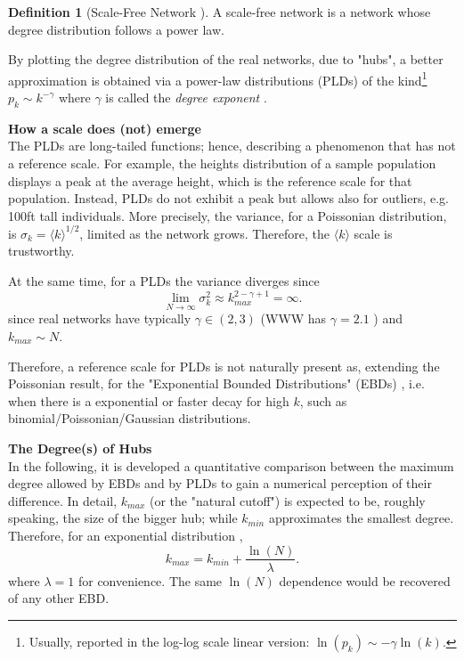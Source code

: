 \documentclass[a4paper,10pt,twoside]{book} %
\theoremstyle{definition}
\newtheorem{definition}{Definition}[section]
\begin{document}
\begin{definition}[Scale-Free Network \cite{Barabasi:1999_ScalRndNet}]
	A scale-free network is a network whose degree distribution follows a power law.
\end{definition}

By plotting the degree distribution of the real networks, due to "hubs", a better approximation is obtained via a power-law distributions (PLDs) of the kind\footnote{Usually, reported in the log-log scale linear version: $\ln(p_k) \sim -\gamma \ln(k)$.} $p_k \sim k^{-\gamma}$  where $\gamma$ is called the \textit{degree exponent} . 

{\large \textbf{How a scale does (not) emerge}} \\
The PLDs are long-tailed functions; hence, describing a phenomenon that has not a reference scale.
For example, the heights distribution of a sample population displays a peak at the average height, which is the reference scale for that population. Instead, PLDs do not exhibit a peak but allows also for outliers, e.g. 100ft tall individuals.
More precisely, the variance, for a Poissonian distribution, is $\sigma_k = \langle k \rangle ^ {1/2}$, limited as the network grows. Therefore, the $\langle k \rangle$ scale is trustworthy. 

At the same time, for a PLDs the variance diverges since \cite{barabasi::2016networkbook}	
\begin{equation}
	\lim_{N \to \infty} \sigma_k^2 \approx k_{max}^{2-\gamma+1} = \infty.
	\label{eq:sigma_SFnets}
\end{equation}
since real networks have typically $\gamma \in (2,3)$ (WWW has $\gamma =  2.1$ \cite{barabasi::2016networkbook}) and $k_{max} \sim N$. 

Therefore, a reference scale for PLDs is not naturally present as, extending the Poissonian result, for the "Exponential Bounded Distributions" (EBDs) \cite{barabasi::2016networkbook}, i.e. when there is a exponential or faster decay for high $k$, such as binomial/Poissonian/Gaussian distributions.

{\large \textbf{The Degree(s) of Hubs}} \\
In the following, it is developed a quantitative comparison between the maximum degree allowed by EBDs and by PLDs to gain a numerical perception of their difference.
In detail, $k_{max}$ (or the "natural cutoff") is expected to be, roughly speaking, the size of the bigger hub; while $k_{min}$ approximates the smallest degree.
Therefore, for an exponential distribution \cite{barabasi::2016networkbook}, 
\begin{equation}
	k_{max} = k_{min} + \frac{\ln(N)}{\lambda}.
	\label{eq:Expkmax_up}	
\end{equation}
where $\lambda = 1$ for convenience. The same $\ln(N)$ dependence would be recovered of any other EBD.
\end{document}
